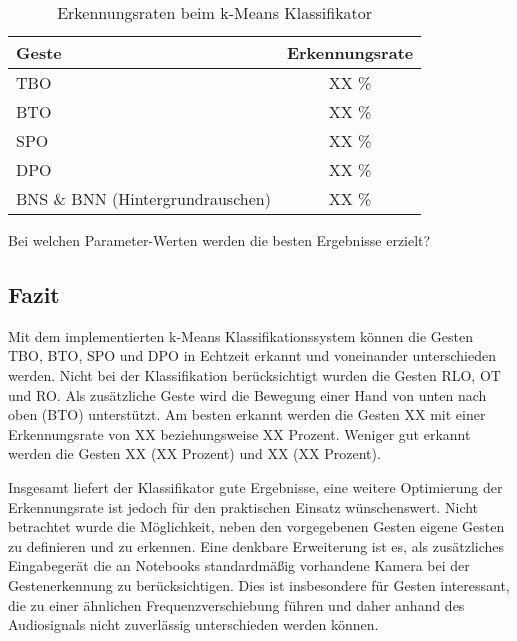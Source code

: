 \begin{table}[h]
\centering
\begin{tabular}{|p{}|c|}
\hline
 \textbf{Geste} & \textbf{Erkennungsrate} \\
 \hline
  \ac{TBO} & XX \% \\
 \hline
  BTO & XX \% \\
 \hline
  \ac{SPO} & XX \% \\
 \hline
  DPO & XX \% \\
 \hline
  \ac{BNS} \& \ac{BNN} (Hintergrund\-rauschen) & XX \%\\
 \hline
\end{tabular}
\caption[Erkennungsraten beim k-Means Klassifikator]{Erkennungsraten beim k-Means Klassifikator}
\label{tab:kMeansEvaluation}
\end{table}

Bei welchen Parameter-Werten werden die besten Ergebnisse erzielt?

\subsection{Fazit}

Mit dem implementierten k-Means Klassifikationssystem können die Gesten \ac{TBO}, BTO, \ac{SPO} und \ac{DPO} in Echtzeit erkannt und voneinander unterschieden werden.
Nicht bei der Klassifikation berücksichtigt wurden die Gesten \ac{RLO}, \ac{OT} und \ac{RO}. Als zusätzliche Geste wird die Bewegung einer Hand von unten nach oben (BTO) unterstützt.
Am besten erkannt werden die Gesten XX mit einer Erkennungsrate von XX beziehungsweise XX Prozent. Weniger gut erkannt werden die Gesten XX (XX Prozent) und XX (XX Prozent). 

Insgesamt liefert der Klassifikator gute Ergebnisse, eine weitere Optimierung der Erkennungsrate ist jedoch 
für den praktischen Einsatz wünschenswert.
Nicht betrachtet wurde die Möglichkeit, neben den vorgegebenen Gesten eigene Gesten zu definieren und zu erkennen. Eine denkbare Erweiterung ist es, als zusätzliches Eingabegerät die an Notebooks standardmäßig vorhandene Kamera bei der Gestenerkennung zu berücksichtigen. Dies ist insbesondere für Gesten interessant, die zu einer ähnlichen Frequenzverschiebung führen und daher anhand des Audiosignals nicht zuverlässig unterschieden werden können. 

